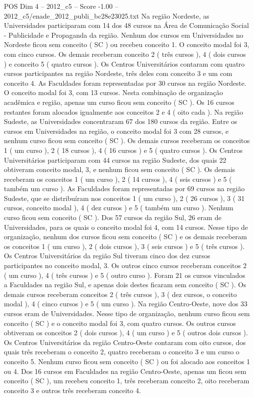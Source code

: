 \begin{textsample}{POS Dim 4 – 2012\_c5 – Score -1.00 – 2012\_c5/enade\_2012\_publi\_bc28e23025.txt}
Na região Nordeste, as Universidades participaram com 14 dos 48 cursos na Área de Comunicação Social - Publicidade e Propaganda da região.
Nenhum dos cursos em Universidades no Nordeste ficou sem conceito ( SC ) ou recebeu conceito 1.
O conceito modal foi 3, com cinco cursos.
Os demais receberam conceito 2 ( três cursos ), 4 ( dois cursos ) e conceito 5 ( quatro cursos ).
Os Centros Universitários contaram com quatro cursos participantes na região Nordeste, três deles com conceito 3 e um com conceito 4.
As Faculdades foram representadas por 30 cursos na região Nordeste.
O conceito modal foi 3, com 13 cursos.
Nesta combinação de organização acadêmica e região, apenas um curso ficou sem conceito ( SC ).
Os 16 cursos restantes foram alocados igualmente aos conceitos 2 e 4 ( oito cada ).
Na região Sudeste, as Universidades concentraram 67 dos 180 cursos da região.
Entre os cursos em Universidades na região, o conceito modal foi 3 com 28 cursos, e nenhum curso ficou sem conceito ( SC ).
Os demais cursos receberam os conceitos 1 ( um curso ), 2 ( 18 cursos ), 4 ( 16 cursos ) e 5 ( quatro cursos ).
Os Centros Universitários participaram com 44 cursos na região Sudeste, dos quais 22 obtiveram conceito modal, 3, e nenhum ficou sem conceito ( SC ).
Os demais receberam os conceitos 1 ( um curso ), 2 ( 14 cursos ), 4 ( seis cursos ) e 5 ( também um curso ).
As Faculdades foram representadas por 69 cursos na região Sudeste, que se distribuíram nos conceitos 1 ( um curso ), 2 ( 26 cursos ), 3 ( 31 cursos, conceito modal ), 4 ( dez cursos ) e 5 ( também um curso ).
Nenhum curso ficou sem conceito ( SC ).
Dos 57 cursos da região Sul, 26 eram de Universidades, para os quais o conceito modal foi 4, com 14 cursos.
Nesse tipo de organização, nenhum dos cursos ficou sem conceito ( SC ) e os demais receberam os conceitos 1 ( um curso ), 2 ( dois cursos ), 3 ( seis cursos ) e 5 ( três cursos ).
Os Centros Universitários da região Sul tiveram cinco dos dez cursos participantes no conceito modal, 3.
Os outros cinco cursos receberam conceitos 2 ( um curso ), 4 ( três cursos ) e 5 ( outro curso ).
Foram 21 os cursos vinculados a Faculdades na região Sul, e apenas dois destes ficaram sem conceito ( SC ).
Os demais cursos receberam conceitos 2 ( três cursos ), 3 ( dez cursos, o conceito modal ), 4 ( cinco cursos ) e 5 ( um curso ).
Na região Centro-Oeste, nove dos 33 cursos eram de Universidades.
Nesse tipo de organização, nenhum curso ficou sem conceito ( SC ) e o conceito modal foi 3, com quatro cursos.
Os outros cursos obtiveram os conceitos 2 ( dois cursos ), 4 ( um curso ) e 5 ( outros dois cursos ).
Os Centros Universitários da região Centro-Oeste contaram com oito cursos, dos quais três receberam o conceito 2, quatro receberam o conceito 3 e um curso o conceito 5.
Nenhum curso ficou sem conceito ( SC ) ou foi alocado aos conceitos 1 ou 4.
Dos 16 cursos em Faculdades na região Centro-Oeste, apenas um ficou sem conceito ( SC ), um recebeu conceito 1, três receberam conceito 2, oito receberam conceito 3 e outros três receberam conceito 4.

\end{textsample}
